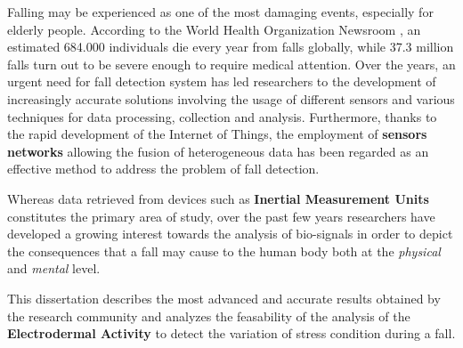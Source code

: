 \label{ch:introduction}

Falling may be experienced as one of the most damaging events, especially for elderly people. According to the World Health Organization Newsroom \cite{WhoData}, an estimated 684.000 individuals die every year from falls globally, while 37.3 million falls turn out to be severe enough to require medical attention. 
Over the years, an urgent need for fall detection system has led researchers to the development of increasingly accurate solutions involving the usage of different sensors and various techniques for data processing, collection and analysis.
Furthermore, thanks to the rapid development of the Internet of Things, the employment of \textbf{sensors networks} allowing the fusion of heterogeneous data has been regarded as an effective method to address the problem of fall detection.

Whereas data retrieved from devices such as \textbf{Inertial Measurement Units} constitutes the primary area of study, over the past few years researchers have developed a growing interest towards the analysis of bio-signals in order to depict the consequences that a fall may cause to the human body both at the \textit{physical} and \textit{mental} level.

This dissertation describes the most advanced and accurate results obtained by the research community and analyzes the feasability of the analysis of the \textbf{Electrodermal Activity} to detect the variation of stress condition during a fall. 

